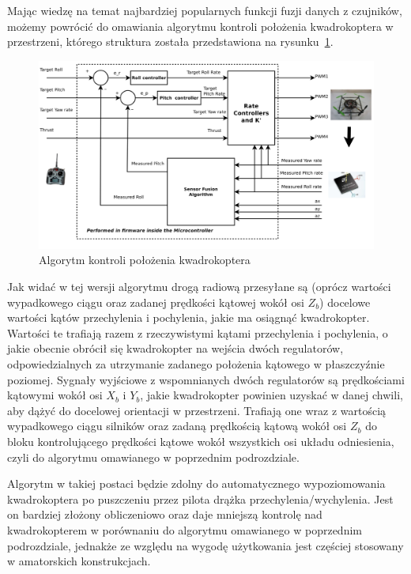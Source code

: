 Mając wiedzę na temat najbardziej popularnych funkcji fuzji danych z czujników, możemy powrócić do omawiania algorytmu kontroli położenia kwadrokoptera w przestrzeni, którego struktura została przedstawiona na rysunku~\ref{fig:angle_control_algorithm}.

\begin{figure}[H]
	\centering
	\includegraphics[width=1.0\textwidth]{Pictures/angle_control_algorithm.png}
		\caption[Algorytm kontroli położenia kwadrokoptera]{Algorytm kontroli położenia kwadrokoptera}
	\label{fig:angle_control_algorithm}
\end{figure}

Jak widać w tej wersji algorytmu drogą radiową przesyłane są (oprócz wartości wypadkowego ciągu oraz zadanej prędkości kątowej wokół osi $Z_b$) docelowe wartości kątów przechylenia i pochylenia, jakie ma osiągnąć kwadrokopter. Wartości te trafiają razem z rzeczywistymi kątami przechylenia i pochylenia, o jakie obecnie obrócił się kwadrokopter na wejścia dwóch regulatorów, odpowiedzialnych za utrzymanie zadanego położenia kątowego w płaszczyźnie poziomej. Sygnały wyjściowe z wspomnianych dwóch regulatorów są prędkościami kątowymi wokół osi $X_b$ i $Y_b$, jakie kwadrokopter powinien uzyskać w danej chwili, aby dążyć do docelowej orientacji w przestrzeni. Trafiają one wraz z wartością wypadkowego ciągu silników oraz zadaną prędkością kątową wokół osi $Z_b$ do bloku kontrolującego prędkości kątowe wokół wszystkich osi układu odniesienia, czyli do algorytmu omawianego w poprzednim podrozdziale. 

Algorytm w takiej postaci będzie zdolny do automatycznego wypoziomowania kwadrokoptera po puszczeniu przez pilota drążka przechylenia/wychylenia. Jest on bardziej złożony obliczeniowo  oraz daje mniejszą kontrolę nad kwadrokopterem w porównaniu do algorytmu omawianego w poprzednim podrozdziale, jednakże ze względu na wygodę użytkowania jest częściej stosowany w amatorskich konstrukcjach.
 


